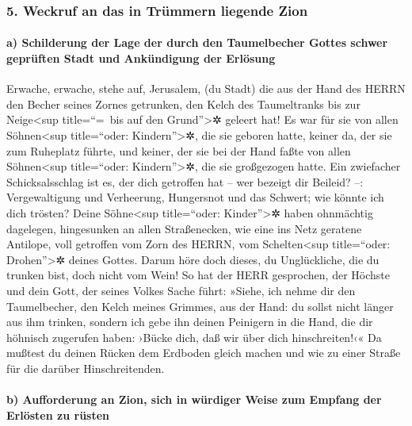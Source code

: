 \hypertarget{weckruf-an-das-in-truxfcmmern-liegende-zion}{%
\subsubsection{5. Weckruf an das in Trümmern liegende
Zion}\label{weckruf-an-das-in-truxfcmmern-liegende-zion}}

\hypertarget{a-schilderung-der-lage-der-durch-den-taumelbecher-gottes-schwer-gepruxfcften-stadt-und-ankuxfcndigung-der-erluxf6sung}{%
\paragraph{a) Schilderung der Lage der durch den Taumelbecher Gottes
schwer geprüften Stadt und Ankündigung der
Erlösung}\label{a-schilderung-der-lage-der-durch-den-taumelbecher-gottes-schwer-gepruxfcften-stadt-und-ankuxfcndigung-der-erluxf6sung}}

Erwache, erwache, stehe auf, Jerusalem, (du Stadt) die
aus der Hand des HERRN den Becher seines Zornes getrunken, den Kelch des
Taumeltranks bis zur Neige\textless sup title=``=~bis auf den
Grund''\textgreater✲ geleert hat! Es war für sie von
allen Söhnen\textless sup title=``oder: Kindern''\textgreater✲, die sie
geboren hatte, keiner da, der sie zum Ruheplatz führte, und keiner, der
sie bei der Hand faßte von allen Söhnen\textless sup title=``oder:
Kindern''\textgreater✲, die sie großgezogen hatte. Ein
zwiefacher Schicksalsschlag ist es, der dich getroffen hat -- wer
bezeigt dir Beileid? --: Vergewaltigung und Verheerung, Hungersnot und
das Schwert; wie könnte ich dich trösten? Deine
Söhne\textless sup title=``oder: Kinder''\textgreater✲ haben ohnmächtig
dagelegen, hingesunken an allen Straßenecken, wie eine ins Netz geratene
Antilope, voll getroffen vom Zorn des HERRN, vom Schelten\textless sup
title=``oder: Drohen''\textgreater✲ deines Gottes. Darum
höre doch dieses, du Unglückliche, die du trunken bist, doch nicht vom
Wein! So hat der HERR gesprochen, der Höchste und dein
Gott, der seines Volkes Sache führt: »Siehe, ich nehme dir den
Taumelbecher, den Kelch meines Grimmes, aus der Hand: du sollst nicht
länger aus ihm trinken, sondern ich gebe ihn deinen
Peinigern in die Hand, die dir höhnisch zugerufen haben: ›Bücke dich,
daß wir über dich hinschreiten!‹« Da mußtest du deinen Rücken dem
Erdboden gleich machen und wie zu einer Straße für die darüber
Hinschreitenden.

\hypertarget{b-aufforderung-an-zion-sich-in-wuxfcrdiger-weise-zum-empfang-der-erluxf6sten-zu-ruxfcsten}{%
\paragraph{b) Aufforderung an Zion, sich in würdiger Weise zum Empfang
der Erlösten zu
rüsten}\label{b-aufforderung-an-zion-sich-in-wuxfcrdiger-weise-zum-empfang-der-erluxf6sten-zu-ruxfcsten}}

